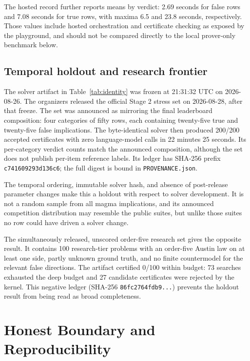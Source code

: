 \documentclass[10pt,twocolumn]{article}
\newcommand{\code}[1]{\texttt{#1}}
\begin{document}
The hosted record further reports means by verdict: 2.69 seconds for
false rows and 7.08 seconds for true rows, with maxima 6.5 and 23.8 seconds,
respectively.  Those values include hosted orchestration and certificate
checking as exposed by the playground, and should not be compared directly to
the local prover-only benchmark below.

\subsection{Temporal holdout and research frontier}
\label{sec:holdout}

The solver artifact in Table~\ref{tab:identity} was frozen at 21:31:32 UTC on
2026-08-26.  The organizers released the official Stage 2 stress
set on 2026-08-28, after that freeze.  The set was
announced as mirroring the final leaderboard composition: four categories of
fifty rows, each containing twenty-five true and twenty-five false
implications.  The byte-identical solver then produced 200/200 accepted
certificates with zero language-model calls in 22 minutes 25 seconds.  Its
per-category verdict counts match the announced composition, although the set
does not publish per-item reference labels.  Its ledger has SHA-256 prefix
\texttt{c741609293d136c6}; the full digest is bound in \code{PROVENANCE.json}.

The temporal ordering, immutable solver hash, and absence of post-release
parameter changes make this a holdout with respect to solver development.  It
is not a random sample from all magma implications, and its announced
competition distribution may resemble the public suites, but unlike those
suites no row could have driven a solver change.

The simultaneously released, unscored order-five research set gives the
opposite result.  It contains 100 research-tier problems with an
order-five Austin law on at least one side, partly unknown ground truth, and no
finite countermodel for the relevant false directions.  The artifact
certified 0/100 within budget: 73 searches exhausted the deep budget and 27
candidate certificates were rejected by the kernel.  This negative ledger
(SHA-256 \texttt{86fc2764fdb9...}) prevents the holdout result from being read
as broad completeness.

\section{Honest Boundary and Reproducibility}
\label{sec:repro}
\end{document}
